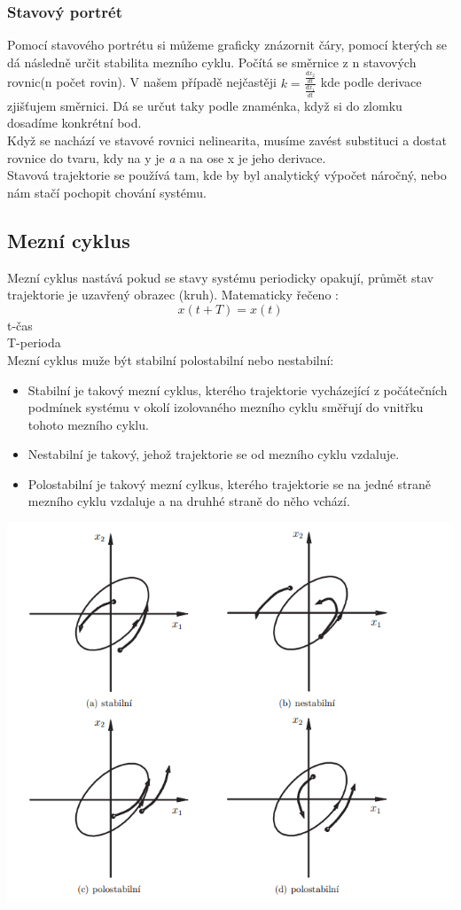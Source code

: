 \subsubsection*{Stavový portrét}
Pomocí stavového portrétu si můžeme graficky znázornit čáry, pomocí kterých se dá následně určit stabilita mezního cyklu. Počítá se směrnice z n stavových rovnic(n počet rovin). V našem případě nejčastěji $k = \frac{\frac{dx_2}{dt}}{\frac{dx_1}{dt}}$ kde podle derivace zjišťujem směrnici. Dá se určut taky podle znaménka, když si do zlomku dosadíme konkrétní bod.\\
Když se nachází ve stavové rovnici nelinearita, musíme zavést substituci a dostat rovnice do tvaru, kdy na y je \textit{a} a na ose x je jeho derivace.\\
Stavová trajektorie se používá tam, kde by byl analytický výpočet náročný, nebo nám stačí pochopit chování systému.

\subsection{Mezní cyklus}
Mezní cyklus nastává pokud se stavy systému periodicky opakují, průmět stav trajektorie je uzavřený obrazec (kruh).
Matematicky řečeno : 
\[x(t+T)=x(t)\]
t-čas \\ T-perioda\\

Mezní cyklus muže být stabilní polostabilní nebo nestabilní:
\begin{itemize}
    \item Stabilní je takový mezní cyklus, kterého trajektorie vycházející z počátečních podmínek systému v okolí izolovaného mezního cyklu směřují do vnitřku tohoto mezního cyklu.
    \item Nestabilní je takový, jehož trajektorie se od mezního cyklu vzdaluje.
    \item Polostabilní je takový mezní cylkus, kterého trajektorie se na jedné straně mezního cyklu vzdaluje a na druhhé straně do něho vchází.
\end{itemize}
\includegraphics{img/mez_cykly.png}

